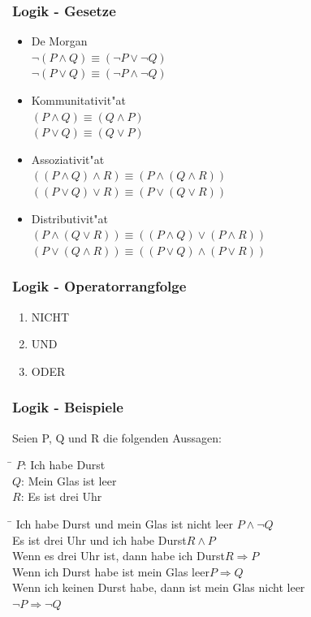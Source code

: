 \documentclass{beamer}
\begin{document}
\frame
{
	\frametitle{Logik - Gesetze}
	{\small
	\begin{itemize}
	\item De Morgan\\
	$\lnot (P \land Q) \equiv (\lnot P \lor \lnot Q)$\\
	$\lnot (P \lor Q) \equiv (\lnot P \land \lnot Q)$
	\item Kommunitativit"at\\
	$(P \land Q) \equiv (Q \land P)$\\
	$(P \lor Q) \equiv (Q \lor P)$
	\item Assoziativit"at\\
	$((P \land Q) \land R) \equiv (P \land (Q \land R))$\\
	$((P \lor Q) \lor R) \equiv (P \lor (Q \lor R))$
	\item Distributivit"at\\
	$(P \land (Q \lor R)) \equiv ((P \land Q) \lor (P \land R))$\\
	$(P \lor (Q \land R)) \equiv ((P \lor Q) \land (P \lor R))$
	\end{itemize}
	}
}

\frame
{
	\frametitle{Logik - Operatorrangfolge}
	\begin{enumerate}
	\item NICHT
	\item UND
	\item ODER
	\end{enumerate}
}

\frame
{
	\frametitle{Logik - Beispiele}
	Seien P, Q und R die folgenden Aussagen:\\
	\begin{tabbing}
	\hspace{2cm} \= \kill
	$P$: \> Ich habe Durst\\
	$Q$: \> Mein Glas ist leer\\
	$R$: \> Es ist drei Uhr
	\end{tabbing}
	{\small
	\begin{tabbing}
	\hspace{8cm} \= \kill
	Ich habe Durst und mein Glas ist nicht leer\> $P \land \lnot Q$\\
	Es ist drei Uhr und ich habe Durst\>$R \land P$\\
	Wenn es drei Uhr ist, dann habe ich Durst\>$R \Rightarrow P$\\
	Wenn ich Durst habe ist mein Glas leer\>$P \Rightarrow Q$\\
	Wenn ich keinen Durst habe, dann ist mein Glas nicht leer\\
	\> $\lnot P \Rightarrow \lnot Q$
	\end{tabbing}
	}
}
\end{document}
